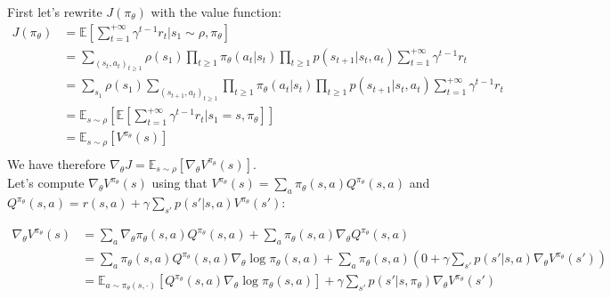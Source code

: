 \documentclass[a4paper]{article}
\begin{document}
First let's rewrite $J(\pi_\theta)$ with the value function:
\begin{equation*}
    \begin{aligned}
        J(\pi_\theta) & = \mathbb{E}\left[\sum_{t=1}^{+\infty} \gamma^{t-1} r_t | s_1 \sim \rho, \pi_\theta \right]                                                                          \\
                      & = \sum_{(s_t, a_t)_{t \ge 1}} \rho(s_1) \prod_{t \ge 1} \pi_\theta(a_t|s_t) \prod_{t \ge 1} p(s_{t+1}|s_t, a_t) \sum_{t=1}^{+\infty} \gamma^{t-1} r_t                \\
                      & = \sum_{s_1} \rho(s_1) \sum_{(s_{t+1}, a_t)_{t \ge 1}} \prod_{t \ge 1} \pi_\theta(a_t|s_t) \prod_{t \ge 1} p(s_{t+1}|s_t, a_t) \sum_{t=1}^{+\infty} \gamma^{t-1} r_t \\
                      & = \mathbb{E}_{s \sim \rho}\left[ \mathbb{E}\left[\sum_{t=1}^{+\infty} \gamma^{t-1} r_t | s_1 = s, \pi_\theta \right]\right]                                          \\
                      & = \mathbb{E}_{s \sim \rho}\left[ V^{\pi_\theta}(s) \right]                                                                                                           \\
    \end{aligned}
\end{equation*}
We have therefore $\nabla_\theta J = \mathbb{E}_{s \sim \rho}\left[ \nabla_\theta V^{\pi_\theta}(s) \right]$.\\
Let's compute $\nabla_\theta V^{\pi_\theta}(s)$ using that $V^{\pi_\theta}(s) = \sum_a \pi_\theta(s, a) Q^{\pi_\theta}(s, a)$ and
$Q^{\pi_\theta}(s, a) = r(s, a) + \gamma \sum_{s'} p(s'|s, a) V^{\pi_\theta}(s')$:

\begin{equation*}
    \begin{aligned}
        \nabla_\theta V^{\pi_\theta}(s) & = \sum_a \nabla_\theta \pi_\theta(s, a) Q^{\pi_\theta}(s, a) + \sum_a \pi_\theta(s, a) \nabla_\theta Q^{\pi_\theta}(s, a)                                                                   \\
                                        & = \sum_a \pi_\theta(s, a) Q^{\pi_\theta}(s, a) \nabla_\theta \log \pi_\theta(s, a) + \sum_a \pi_\theta(s, a) \left(0 + \gamma \sum_{s'} p(s'|s, a) \nabla_\theta V^{\pi_\theta}(s') \right) \\
                                        & = \mathbb{E}_{a \sim \pi_\theta(s, \cdot)}[Q^{\pi_\theta}(s, a) \nabla_\theta \log \pi_\theta(s, a)] + \gamma \sum_{s'} p(s'|s, \pi_\theta) \nabla_\theta V^{\pi_\theta}(s')                \\
    \end{aligned}
\end{equation*}
\vspace{10px}
\end{document}
